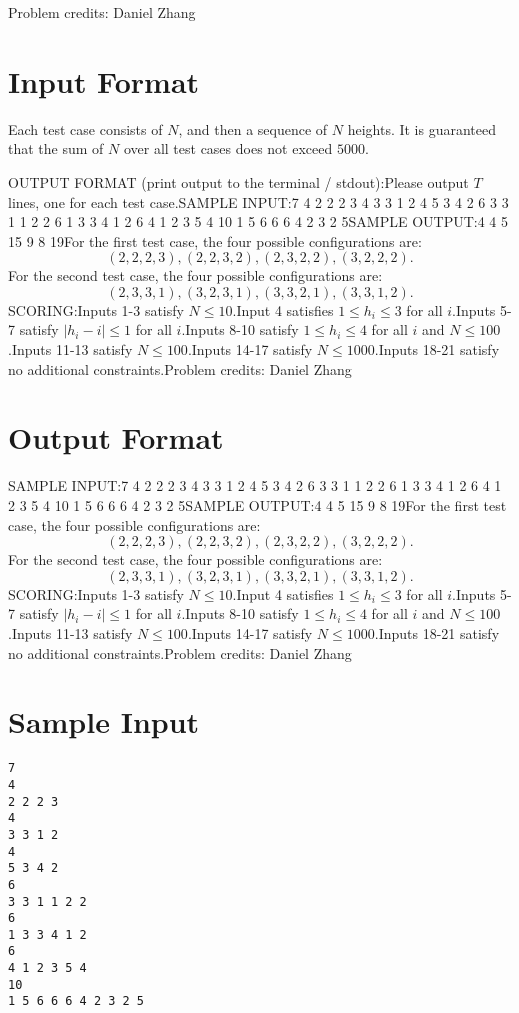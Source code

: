 \documentclass[12pt]{article}
\begin{document}
Problem credits: Daniel Zhang



\section*{Input Format}
Each test case consists of $N$, and then a sequence of $N$ heights. It is
guaranteed that the sum of $N$ over all test cases does not exceed $5000$.

OUTPUT FORMAT (print output to the terminal / stdout):Please output $T$ lines, one for each test case.SAMPLE INPUT:7
4
2 2 2 3
4
3 3 1 2
4
5 3 4 2
6
3 3 1 1 2 2
6
1 3 3 4 1 2
6
4 1 2 3 5 4
10
1 5 6 6 6 4 2 3 2 5SAMPLE OUTPUT:4
4
5
15
9
8
19For the first test case, the four possible configurations are:$$(2,2,2,3), (2,2,3,2), (2,3,2,2), (3,2,2,2).$$For the second test case, the four possible configurations are:$$(2,3,3,1),(3,2,3,1),(3,3,2,1), (3,3,1,2).$$SCORING:Inputs 1-3 satisfy $N\le 10$.Input 4 satisfies $1\le h_i\le 3$ for all $i$.Inputs 5-7 satisfy $|h_i-i|\le 1$ for all $i$.Inputs 8-10 satisfy $1\le h_i\le 4$ for all $i$ and $N\le 100$.Inputs 11-13 satisfy $N\le 100$.Inputs 14-17 satisfy $N\le 1000$.Inputs 18-21 satisfy no additional constraints.Problem credits: Daniel Zhang

\section*{Output Format}
SAMPLE INPUT:7
4
2 2 2 3
4
3 3 1 2
4
5 3 4 2
6
3 3 1 1 2 2
6
1 3 3 4 1 2
6
4 1 2 3 5 4
10
1 5 6 6 6 4 2 3 2 5SAMPLE OUTPUT:4
4
5
15
9
8
19For the first test case, the four possible configurations are:$$(2,2,2,3), (2,2,3,2), (2,3,2,2), (3,2,2,2).$$For the second test case, the four possible configurations are:$$(2,3,3,1),(3,2,3,1),(3,3,2,1), (3,3,1,2).$$SCORING:Inputs 1-3 satisfy $N\le 10$.Input 4 satisfies $1\le h_i\le 3$ for all $i$.Inputs 5-7 satisfy $|h_i-i|\le 1$ for all $i$.Inputs 8-10 satisfy $1\le h_i\le 4$ for all $i$ and $N\le 100$.Inputs 11-13 satisfy $N\le 100$.Inputs 14-17 satisfy $N\le 1000$.Inputs 18-21 satisfy no additional constraints.Problem credits: Daniel Zhang

\section*{Sample Input}
\begin{verbatim}
7
4
2 2 2 3
4
3 3 1 2
4
5 3 4 2
6
3 3 1 1 2 2
6
1 3 3 4 1 2
6
4 1 2 3 5 4
10
1 5 6 6 6 4 2 3 2 5
\end{verbatim}
\end{document}
